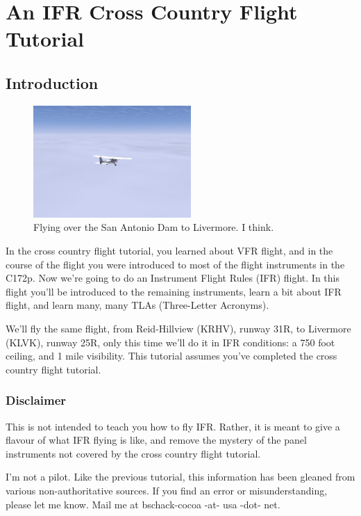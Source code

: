 \chapter{An IFR Cross Country Flight Tutorial\label{ifr}}

\section{Introduction}

\begin{figure}[h]
  \begin{center}
    \includegraphics[width=6cm]{img/somewhere}
    \caption{Flying over the San Antonio Dam to Livermore.  I think.}
    \label{fig:somewhere}
  \end{center}
\end{figure}

In the cross country flight tutorial, you learned about VFR flight,
and in the course of the flight you were introduced to most of the
flight instruments in the C172p.  Now we're going to do an Instrument
Flight Rules (IFR) flight.  In this flight you'll be introduced to the
remaining instruments, learn a bit about IFR flight, and learn many,
many TLAs (Three-Letter Acronyms).

We'll fly the same flight, from Reid-Hillview (KRHV), runway 31R, to
Livermore (KLVK), runway 25R, only this time we'll do it in IFR
conditions: a 750 foot ceiling, and 1 mile visibility.  This tutorial
assumes you've completed the cross country flight tutorial.

\subsection{Disclaimer}

This is not intended to teach you how to fly IFR.  Rather, it is meant
to give a flavour of what IFR flying is like, and remove the mystery
of the panel instruments not covered by the cross country flight
tutorial.

I'm not a pilot.  Like the previous tutorial, this information has
been gleaned from various non-authoritative sources.  If you find an
error or misunderstanding, please let me know.  Mail me at
bschack-cocoa -at- usa -dot- net.

